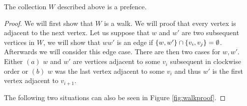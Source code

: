   \begin{lemma}
    \label{lm:red:isPrefence}
  The collection $W$ described above is a prefence.
  \end{lemma}
  \begin{proof}
  We will first show that $W$ is a walk. We will proof that every vertex is adjacent to the next vertex. Let us suppose that $w$ and $w'$ are two subsequent vertices in $W$, we will show that $ww'$ is an edge if $\left\lbrace {w, w'} \right\rbrace \cap \left\lbrace {v_i, v_j } \right\rbrace = \emptyset$. Afterwards we will consider this edge case. There are then two cases for $w, w'$. Either $(a)$ $w$ and $w'$ are vertices adjacent to some $v_i$ subsequent in clockwise order or $(b)$ $w$ was the last vertex adjacent to some $v_i$ and thus $w'$ is the first vertex adjacent to $v_{i+1}$.

  The following two situations can also be seen in Figure \ref{fig:walkproof}.


\end{proof}

